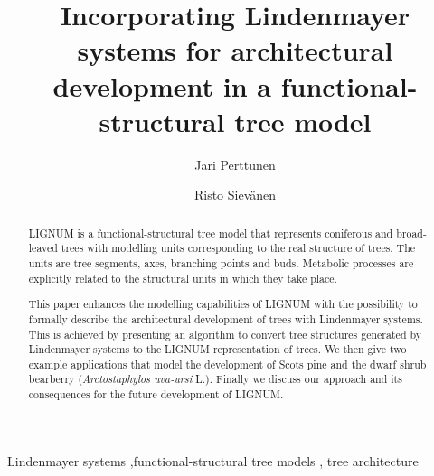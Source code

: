 \documentclass[doublespacing]{elsart}
\begin{document}
\begin{frontmatter}


\title{Incorporating Lindenmayer systems for architectural development
in a functional-structural tree model}
\author[Metla]{Jari Perttunen}
\author[Metla]{Risto Siev\"anen}

\address[Metla]{Vantaa   Research  Centre,  Finnish   Forest  Research
Institute, PL 18,  01301 Vantaa, Finland.}




\begin{abstract}
  LIGNUM  is  a   functional-structural  tree  model  that  represents
  coniferous and broad-leaved trees with modelling units corresponding
  to the real structure of  trees.  The units are tree segments, axes,
  branching  points  and  buds.   Metabolic processes  are  explicitly
  related to the structural units in which they take place.
  
  This paper  enhances the modelling  capabilities of LIGNUM  with the
  possibility  to formally describe  the architectural  development of
  trees with  Lindenmayer systems. This  is achieved by  presenting an
  algorithm  to  convert  tree  structures  generated  by  Lindenmayer
  systems to  the LIGNUM  representation of trees.   We then  give two
  example applications  that model the  development of Scots  pine and
  the  dwarf shrub  bearberry  (\textit{Arctostaphylos uva-ursi}  L.).
  Finally we discuss our approach  and its consequences for the future
  development of LIGNUM.

\end{abstract}

\begin{keyword}

 Lindenmayer systems \sep functional-structural tree models \sep 
 tree architecture


\end{keyword}

\end{frontmatter}







\end{document}
